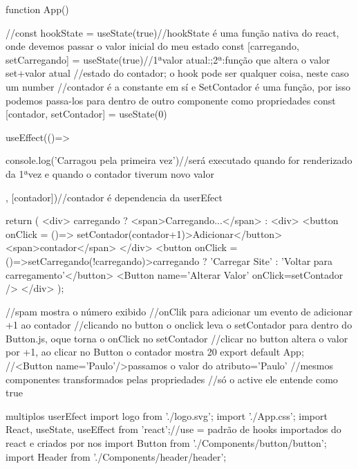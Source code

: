 function App() {
 
  //const hookState = useState(true)//hookState é uma função nativa do react, onde devemos passar o valor inicial do meu estado
  const [carregando, setCarregando] = useState(true)//1ªvalor atual:;2ª:função que altera o valor set+valor atual
  //estado do contador; o hook pode ser qualquer coisa, neste caso um number
  //contador é a constante em sí e SetContador é uma função, por isso podemos passa-los para dentro de outro componente como propriedades
  const [contador, setContador] = useState(0)

  useEffect(()=>{
    console.log('Carragou pela primeira vez')//será executado quando for renderizado da 1ªvez e quando o contador tiverum novo valor

  }, [contador])//contador é dependencia da userEfect

  return (
   <div>
    {carregando ? 
    <span>Carregando...</span> 
    :
    <div>
      <button onClick = {()=> setContador(contador+1)}>Adicionar</button>
      <span>{contador}</span>
    </div>
    }
    <button onClick = {()=>setCarregando(!carregando)}>{carregando ? 'Carregar Site' : 'Voltar para carregamento'}</button>
    <Button name='Alterar Valor' onClick={setContador} />
    </div>
  );
}
//spam mostra o número exibido
//onClik para adicionar um evento de adicionar +1 ao contador
//clicando no button o onclick leva o setContador para dentro do Button.js, oque torna o onClick no setContador
//clicar no button altera o valor por +1, ao clicar no Button o contador mostra 20 
export default App;
//<Button name='Paulo'/>passamos o valor do atributo='Paulo'
//mesmos componentes transformados pelas propriedades
//só o active ele entende como true

multiplos userEfect
import logo from './logo.svg';
import './App.css';
import React, { useState, useEffect } from 'react';//use = padrão de hooks importados do react e criados por nos
import Button from './Components/button/button';
import Header from './Components/header/header';


